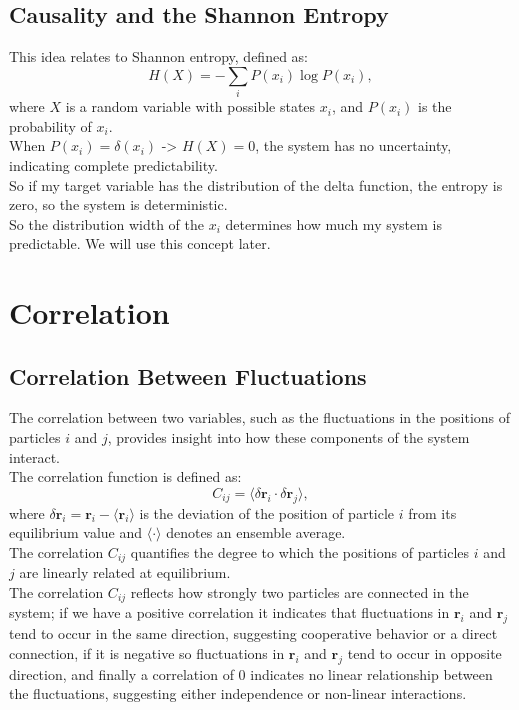 \documentclass[English, Lau, oneside]{sapthesis}
\begin{document}
\subsection{Causality and the Shannon Entropy}
\noindent This idea relates to Shannon entropy, defined as:
\[
H(X) = -\sum_{i} P(x_i) \log P(x_i),
\]
where \( X \) is a random variable with possible states \( x_i \), and \( P(x_i) \) is the probability of \( x_i \).\\
 When \( P(x_i) = \delta(x_i) \) -> \( H(X) = 0 \), the system has no uncertainty, indicating complete predictability.\\
So if my target variable has the distribution of the delta function, the entropy is zero, so the system is deterministic.\\
So the distribution width of the \( x_i \) determines how much my system is predictable. 
We will use this concept later.



\newpage
\section{Correlation}
\subsection{Correlation Between Fluctuations}
\noindent
The correlation between two variables, such as the fluctuations in the positions of particles \( i \) and \( j \), provides insight into how these components of the system interact.\\
The correlation function is defined as:\cite{ref13}
\begin{equation}
    C_{ij} = \langle \delta \mathbf{r}_i \cdot \delta \mathbf{r}_j \rangle, \label{correlation}
\end{equation}
where \( \delta \mathbf{r}_i = \mathbf{r}_i - \langle \mathbf{r}_i \rangle \) is the deviation of the position of particle \( i \) from its equilibrium value and \( \langle \cdot \rangle \) denotes an ensemble average.\\
The correlation \( C_{ij} \) quantifies the degree to which the positions of particles \( i \) and \( j \) are linearly related at equilibrium.\\
The correlation \( C_{ij} \) reflects how strongly two particles are connected in the system; if we have a positive correlation it indicates that fluctuations in \( \mathbf{r}_i \) and \( \mathbf{r}_j \) tend to occur in the same direction, suggesting cooperative behavior or a direct connection, if it is negative so fluctuations in \( \mathbf{r}_i \) and \( \mathbf{r}_j \) tend to occur in opposite direction, and finally a correlation of 0 indicates no linear relationship between the fluctuations, suggesting either independence or non-linear interactions.\\
\end{document}
